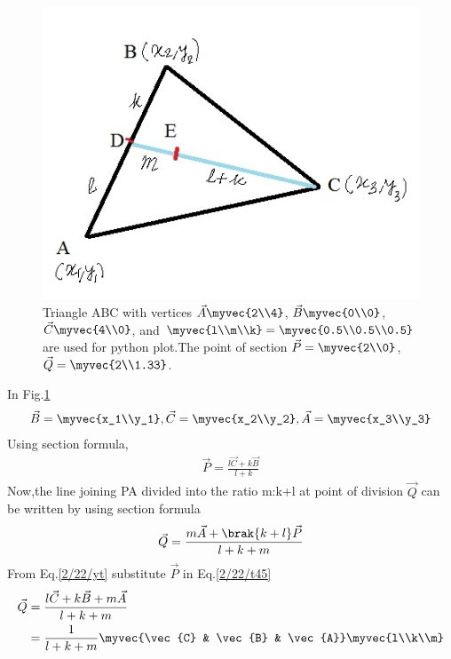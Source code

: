 \begin{figure}[h!]
       \centering
        \includegraphics[width =\linewidth]{solutions/2/22/assignment1.jpg}
        \caption{Triangle ABC with vertices $\vec{A}\myvec{2\\4}$, $\vec{B}\myvec{0\\0}$, $\vec{C}\myvec{4\\0}$, and $\myvec{l\\m\\k}=\myvec{0.5\\0.5\\0.5}$ are used for python plot.The point of section $\vec{P}=\myvec{2\\0}$, $\vec{Q}=\myvec{2\\1.33}$.}\label{2/22/t1}
\end{figure}
In  Fig.\ref{2/22/t1}
\begin{align}
    \vec{B}=\myvec{x_1\\y_1},
    \vec{C}=\myvec{x_2\\y_2},
     \vec{A}=\myvec{x_3\\y_3}
\end{align}
Using section formula,
\begin{align}
    \vec{P}=\frac{l\vec{C}+k\vec{B}}{l+k}\label{2/22/yt}
\end{align}
Now,the line joining PA divided into the ratio m:k+l at point of division $\vec{Q}$ can be written by using section formula 
\begin{align}
    \vec{Q}=\frac{m\vec{A}+\brak{k+l}\vec{P}}{l+k+m}\label{2/22/t45}
\end{align}
From Eq.\eqref{2/22/yt} substitute $\vec{P}$ in Eq.\eqref{2/22/t45}
\begin{align}
    \vec{Q}&=\frac{l\vec{C}+k\vec{B}+m\vec{A}}{l+k+m} \\
    &=\frac{1}{l+k+m}\myvec{\vec{C} & \vec{B} & \vec{A}}\myvec{l\\k\\m}
\end{align}
